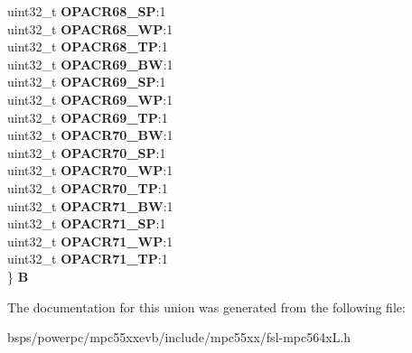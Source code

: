 \begin{DoxyCompactItemize}
\begin{tabbing}
\>uint32\_t {\bfseries OPACR68\_SP}:1\\
\>uint32\_t {\bfseries OPACR68\_WP}:1\\
\>uint32\_t {\bfseries OPACR68\_TP}:1\\
\>uint32\_t {\bfseries OPACR69\_BW}:1\\
\>uint32\_t {\bfseries OPACR69\_SP}:1\\
\>uint32\_t {\bfseries OPACR69\_WP}:1\\
\>uint32\_t {\bfseries OPACR69\_TP}:1\\
\>uint32\_t {\bfseries OPACR70\_BW}:1\\
\>uint32\_t {\bfseries OPACR70\_SP}:1\\
\>uint32\_t {\bfseries OPACR70\_WP}:1\\
\>uint32\_t {\bfseries OPACR70\_TP}:1\\
\>uint32\_t {\bfseries OPACR71\_BW}:1\\
\>uint32\_t {\bfseries OPACR71\_SP}:1\\
\>uint32\_t {\bfseries OPACR71\_WP}:1\\
\>uint32\_t {\bfseries OPACR71\_TP}:1\\
\} {\bfseries B}\\

\end{tabbing}\end{DoxyCompactItemize}


The documentation for this union was generated from the following file\+:\begin{DoxyCompactItemize}
\item 
bsps/powerpc/mpc55xxevb/include/mpc55xx/fsl-\/mpc564x\+L.\+h\end{DoxyCompactItemize}
